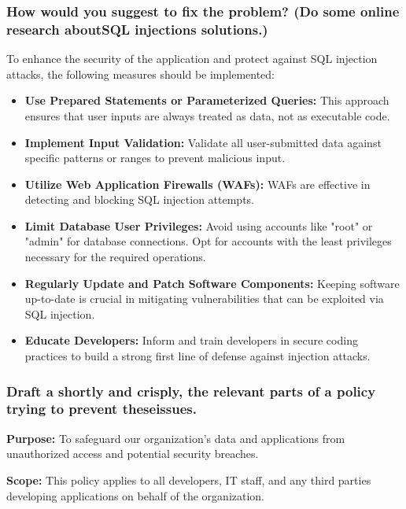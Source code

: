 \subsubsection{How would you suggest to fix the problem? (Do some online research aboutSQL injections solutions.)}
To enhance the security of the application and protect against SQL injection attacks, the following measures should be implemented:

\begin{itemize}
      \item \textbf{Use Prepared Statements or Parameterized Queries:} This approach ensures that user inputs are always treated as data, not as executable code.

      \item \textbf{Implement Input Validation:} Validate all user-submitted data against specific patterns or ranges to prevent malicious input.

      \item \textbf{Utilize Web Application Firewalls (WAFs):} WAFs are effective in detecting and blocking SQL injection attempts.

      \item \textbf{Limit Database User Privileges:} Avoid using accounts like "root" or "admin" for database connections. Opt for accounts with the least privileges necessary for the required operations.

      \item \textbf{Regularly Update and Patch Software Components:} Keeping software up-to-date is crucial in mitigating vulnerabilities that can be exploited via SQL injection.

      \item \textbf{Educate Developers:} Inform and train developers in secure coding practices to build a strong first line of defense against injection attacks.
\end{itemize}

\subsubsection{Draft a shortly and crisply, the relevant parts of a policy trying to prevent theseissues.}
\textbf{Purpose:}
To safeguard our organization's data and applications from unauthorized access and potential security breaches.

\textbf{Scope:}
This policy applies to all developers, IT staff, and any third parties developing applications on behalf of the organization.

